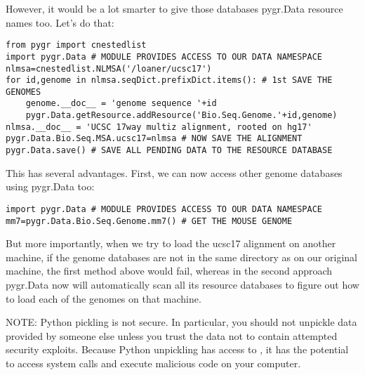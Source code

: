 \documentclass{howto}
\begin{document}
However, it would be a lot smarter to give those databases pygr.Data resource
names too.  Let's do that:
\begin{verbatim}
from pygr import cnestedlist
import pygr.Data # MODULE PROVIDES ACCESS TO OUR DATA NAMESPACE
nlmsa=cnestedlist.NLMSA('/loaner/ucsc17')
for id,genome in nlmsa.seqDict.prefixDict.items(): # 1st SAVE THE GENOMES
    genome.__doc__ = 'genome sequence '+id
    pygr.Data.getResource.addResource('Bio.Seq.Genome.'+id,genome)
nlmsa.__doc__ = 'UCSC 17way multiz alignment, rooted on hg17'
pygr.Data.Bio.Seq.MSA.ucsc17=nlmsa # NOW SAVE THE ALIGNMENT
pygr.Data.save() # SAVE ALL PENDING DATA TO THE RESOURCE DATABASE
\end{verbatim}

This has several advantages.  First, we can now access other genome databases
using pygr.Data too:
\begin{verbatim}
import pygr.Data # MODULE PROVIDES ACCESS TO OUR DATA NAMESPACE
mm7=pygr.Data.Bio.Seq.Genome.mm7() # GET THE MOUSE GENOME
\end{verbatim}
But more importantly, when we try to load the ucsc17 alignment on
another machine, if the genome databases are not in the same directory
as on our original machine, the first method above would fail, whereas in
the second approach pygr.Data now will automatically scan all its resource databases to
figure out how to load each of the genomes on that machine.

NOTE: Python pickling is not secure.  In particular, you should not unpickle
data provided by someone else unless you trust the data not to contain 
attempted security exploits.  Because Python unpickling has access to ,
it has the potential to access system calls and execute malicious code on your
computer.
\end{document}

